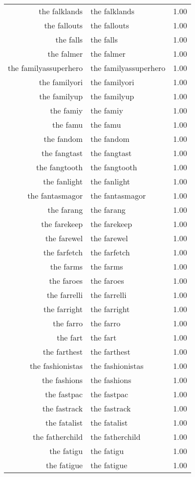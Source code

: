 \begin{table}[ht]
\begin{tabular}{rlr}
  the falklands & the falklands & 1.00 \\ 
  the fallouts & the fallouts & 1.00 \\ 
  the falls & the falls & 1.00 \\ 
  the falmer & the falmer & 1.00 \\ 
  the familyassuperhero & the familyassuperhero & 1.00 \\ 
  the familyori & the familyori & 1.00 \\ 
  the familyup & the familyup & 1.00 \\ 
  the famiy & the famiy & 1.00 \\ 
  the famu & the famu & 1.00 \\ 
  the fandom & the fandom & 1.00 \\ 
  the fangtast & the fangtast & 1.00 \\ 
  the fangtooth & the fangtooth & 1.00 \\ 
  the fanlight & the fanlight & 1.00 \\ 
  the fantasmagor & the fantasmagor & 1.00 \\ 
  the farang & the farang & 1.00 \\ 
  the farekeep & the farekeep & 1.00 \\ 
  the farewel & the farewel & 1.00 \\ 
  the farfetch & the farfetch & 1.00 \\ 
  the farms & the farms & 1.00 \\ 
  the faroes & the faroes & 1.00 \\ 
  the farrelli & the farrelli & 1.00 \\ 
  the farright & the farright & 1.00 \\ 
  the farro & the farro & 1.00 \\ 
  the fart & the fart & 1.00 \\ 
  the farthest & the farthest & 1.00 \\ 
  the fashionistas & the fashionistas & 1.00 \\ 
  the fashions & the fashions & 1.00 \\ 
  the fastpac & the fastpac & 1.00 \\ 
  the fastrack & the fastrack & 1.00 \\ 
  the fatalist & the fatalist & 1.00 \\ 
  the fatherchild & the fatherchild & 1.00 \\ 
  the fatigu & the fatigu & 1.00 \\ 
  the fatigue & the fatigue & 1.00 \\ 

\end{tabular}
\end{table}

